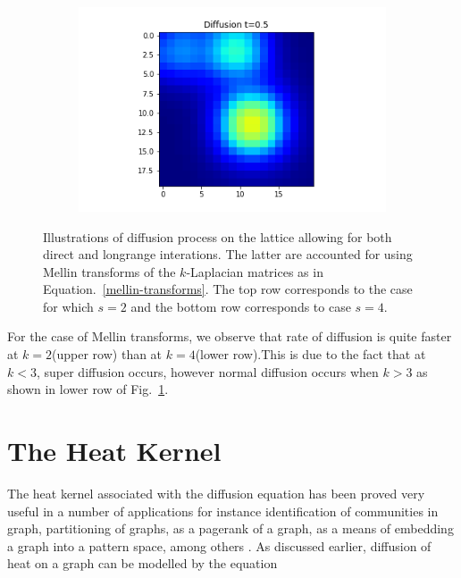 \documentclass[10pt,a4paper]{article}
\begin{document}
\begin{enumerate}[i)]
\begin{enumerate}[a)]
\begin{figure}[!h]
\begin{subfigure}[b]{0.25\textwidth}
    			\end{subfigure}~
    			\begin{subfigure}[b]{0.25\textwidth}
    				\includegraphics[width= \textwidth]{images/mellin-x4-t5.png}
    			\end{subfigure}
    			\caption{Illustrations of diffusion process on the lattice allowing for both direct and longrange interations. The latter are accounted for using Mellin transforms of the $k$-Laplacian matrices as in Equation.~\ref{mellin-transforms}. The top row corresponds to the case for which $s=2$ and the bottom row corresponds to case $s=4$.}
    			\label{mellintransformsfig}
    		\end{figure}
    		For the case of Mellin transforms, we observe that rate of diffusion is quite faster at $k=2$(upper row) than at $k=4$(lower row).This is due to the fact that at $k<3$, super diffusion occurs, however normal diffusion occurs when $k>3$ as shown in lower row of Fig.~\ref{mellintransformsfig}.
    	\end{enumerate}
    \end{enumerate}
        
        \newpage
        \section{The Heat Kernel}
        The heat kernel associated with the diffusion equation has been proved very useful in a number of applications for instance identification of communities in graph,  partitioning of graphs, as a pagerank of a graph, as a means of embedding a graph into a pattern space, among others \citep{chung2007heat,chung2009local,kloster2014heat}. 
        As discussed earlier, diffusion of heat on a graph can be modelled by the equation 
        
\end{document}
